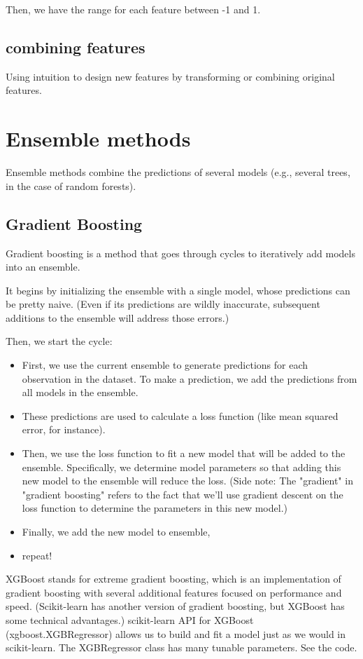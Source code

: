 \documentclass[12pt]{report}
\begin{document}
Then, we have the range for each feature between -1 and 1.

\subsection{combining features}
Using intuition to design new features by transforming or combining original features.

\section{Ensemble methods}
Ensemble methods combine the predictions of several models (e.g., several trees, in the case of random forests).

\subsection{Gradient Boosting}
Gradient boosting is a method that goes through cycles to iteratively add models into an ensemble.

It begins by initializing the ensemble with a single model, whose predictions can be pretty naive. (Even if its predictions are wildly inaccurate, subsequent additions to the ensemble will address those errors.)

Then, we start the cycle:
\begin{itemize}
  \item First, we use the current ensemble to generate predictions for each observation in the dataset. To make a prediction, we add the predictions from all models in the ensemble.
  \item These predictions are used to calculate a loss function (like mean squared error, for instance).
  \item Then, we use the loss function to fit a new model that will be added to the ensemble. Specifically, we determine model parameters so that adding this new model to the ensemble will reduce the loss. (Side note: The "gradient" in "gradient boosting" refers to the fact that we'll use gradient descent on the loss function to determine the parameters in this new model.)
  \item Finally, we add the new model to ensemble,
  \item repeat!
\end{itemize}

XGBoost stands for extreme gradient boosting, which is an implementation of gradient boosting with several additional features focused on performance and speed. (Scikit-learn has another version of gradient boosting, but XGBoost has some technical advantages.) scikit-learn API for XGBoost (xgboost.XGBRegressor) allows us to build and fit a model just as we would in scikit-learn. The XGBRegressor class has many tunable parameters. See the code.
\end{document}

